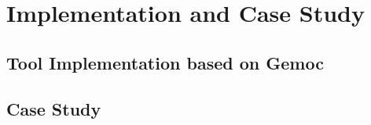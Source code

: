 \section{Implementation and Case Study}
\subsection{Tool Implementation based on Gemoc }
\subsection{Case Study}
